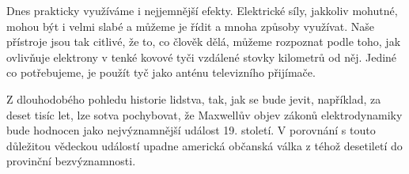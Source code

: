     Dnes prakticky využíváme i nejjemnější efekty. Elektrické síly, jakkoliv mohutné, mohou být i 
    velmi slabé a můžeme je řídit a mnoha způsoby využívat. Naše přístroje jsou tak citlivé, že to, 
    co člověk dělá, můžeme rozpoznat podle toho, jak ovlivňuje elektrony v tenké kovové tyči 
    vzdálené stovky kilometrů od něj. Jediné co potřebujeme, je použít tyč jako anténu televizního 
    přijímače.

    Z dlouhodobého pohledu historie lidstva, tak, jak se bude jevit, například, za deset tisíc let, 
    lze sotva pochybovat, že Maxwellův objev zákonů elektrodynamiky bude hodnocen jako 
    nejvýznamnější událost 19. století. V porovnání s touto důležitou vědeckou událostí upadne 
    americká občanská válka z téhož desetiletí do provinční bezvýznamnosti.

\printbibliography[heading=subbibliography]
